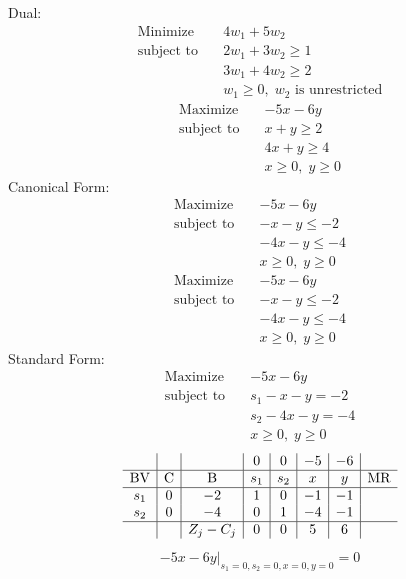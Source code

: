 \documentclass{article}
\begin{document}
Dual:\\
\begin{align*}
\text{Minimize} \quad & 4w_{1} + 5w_{2}\\
\text{subject to} \quad
& 2w_{1} + 3w_{2}\ge1\\
& 3w_{1} + 4w_{2}\ge2\\
& w_{1}\ge0,\; w_{2}\text{ is unrestricted}\end{align*}
\begin{align*}
\text{Maximize} \quad & -5x - 6y\\
\text{subject to} \quad
& x + y\ge2\\
& 4x + y\ge4\\
& x\ge0,\; y\ge0\end{align*}
Canonical Form:\\
\begin{align*}
\text{Maximize} \quad & -5x - 6y\\
\text{subject to} \quad
& -x - y\le-2\\
& -4x - y\le-4\\
& x\ge0,\; y\ge0\end{align*}
\begin{align*}
\text{Maximize} \quad & -5x - 6y\\
\text{subject to} \quad
& -x - y\le-2\\
& -4x - y\le-4\\
& x\ge0,\; y\ge0\end{align*}
Standard Form:\\
\begin{align*}
\text{Maximize} \quad & -5x - 6y\\
\text{subject to} \quad
& s_{1} - x - y=-2\\
& s_{2} - 4x - y=-4\\
& x\ge0,\; y\ge0\end{align*}
\begin{align*}
\begin{array}{c|c|c|c|c|c|c|c}
 &  &  & 0 & 0 & -5 & -6 & \\
\hline
\text{BV} & \text{C} & \text{B} & s_{1} & s_{2} & x & y & \text{MR} \\
\hline
s_{1} & 0 & -2 & 1 & 0 & -1 & -1 \\
s_{2} & 0 & -4 & 0 & 1 & -4 & -1 \\
\hline
 &  & Z_j-C_j & 0 & 0 & 5 & 6 & \\
\end{array}
\end{align*}
\begin{align*}
\left.-5x - 6y\right|_{s_{1}=0,s_{2}=0,x=0,y=0}=0\end{align*}
\end{document}
